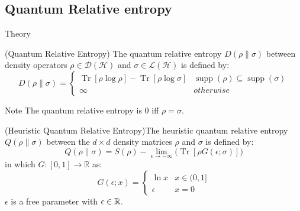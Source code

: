 \documentclass{beamer}
\begin{document}
\subsection{Quantum Relative entropy}
\begin{frame}{Theory}
\begin{tiny}
\begin{definition}(Quantum Relative Entropy) The quantum relative entropy $D(\rho \| \sigma)$ between density operators $\rho \in \mathcal{D}(\mathcal{H})$ and $\sigma \in \mathcal{L}(\mathcal{H})$ is defined by:
\begin{equation*}
D(\rho \| \sigma)= 
 \begin{cases} 
      \operatorname{Tr}[ \rho\log \rho ]-\operatorname{Tr} [ \rho \log \sigma]   & \operatorname{supp}(\rho) \subseteq \operatorname{supp}(\sigma) \\
      \infty & otherwise 
\end{cases}
\end{equation*}
\end{definition}
\begin{alertblock}{Note}
The quantum relative entropy is 0 iff $\rho = \sigma$.
\end{alertblock}
\begin{definition}(Heuristic Quantum Relative Entropy)The heuristic quantum relative entropy $Q(\rho \| \sigma)$ between the $d \times d$ density matrices $\rho$ and $\sigma$ is defined by:
\begin{equation*}
Q(\rho \| \sigma)= S(\rho)-\lim_{\epsilon \to -\infty} \big( \operatorname{Tr}[\rho  G(\epsilon; \sigma)] \big)
\end{equation*}
in which $G: [0,1] \rightarrow \mathbb{R}$ as:
\begin{equation*}
G(\epsilon;x)=
\begin{cases}
   \ln x   &   x \in (0,1] \\
   \epsilon  &   x=0
\end{cases}
\end{equation*}
$\epsilon$ is a free parameter with $\epsilon \in \mathbb{R}$.
\end{definition}
\end{tiny}
\end{frame}
\end{document}
